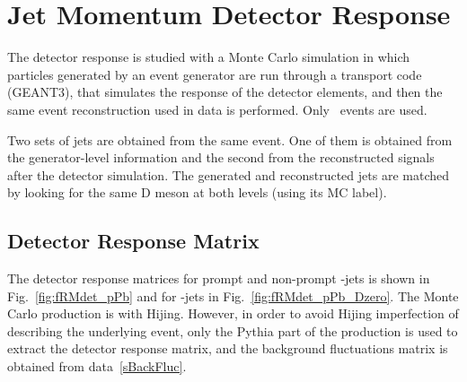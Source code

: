 
\section{Jet Momentum Detector Response}

The detector response is studied with a Monte Carlo simulation in which particles generated by an event generator are
run through a transport code (GEANT3), that simulates the response of the detector elements, and then the same event reconstruction used in data is performed. Only \ccbar\ events are used.

Two sets of jets are obtained from the same event. One of them is obtained from the generator-level information and the second from the reconstructed signals after the detector simulation. 
The generated and reconstructed jets are matched by looking for the same D meson at both levels (using its MC label).


\subsection{Detector Response Matrix}
\label{Det_Resp}

The detector response matrices for prompt and non-prompt \Dstar-jets is shown in Fig.~\ref{fig:fRMdet_pPb} and for \Dzero-jets in Fig.~\ref{fig:fRMdet_pPb_Dzero}.
The Monte Carlo production is with Hijing. However, in order to avoid Hijing imperfection of describing the underlying event, 
only the Pythia part of the production is used to extract the detector response matrix, and the background fluctuations matrix is obtained from data~\ref{sBackFluc}.

